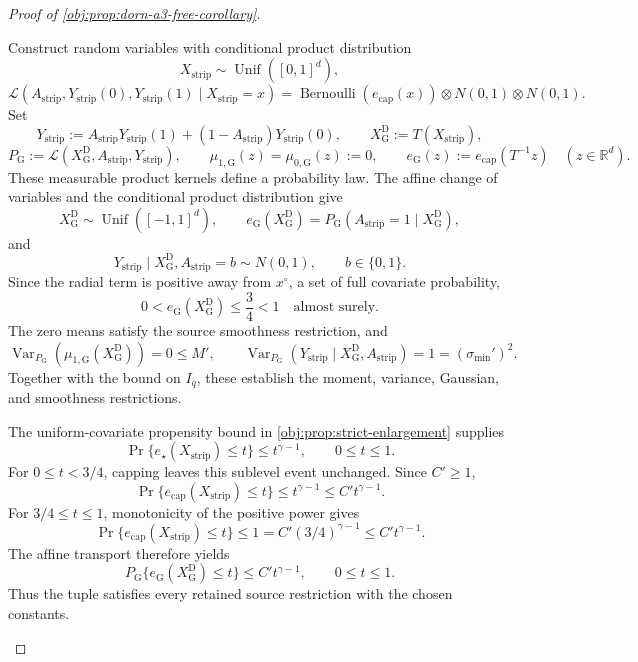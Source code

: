 \begin{proof}[Proof of \cref{obj:prop:dorn-a3-free-corollary}]
\begin{enumerate}
Construct random variables with conditional product distribution
\[
X_{\mathrm{strip}}\sim\operatorname{Unif}([0,1]^d),
\]
\[
\mathcal L\!\left(
A_{\mathrm{strip}},Y_{\mathrm{strip}}(0),Y_{\mathrm{strip}}(1)
\mid X_{\mathrm{strip}}=x
\right)
=
\operatorname{Bernoulli}(e_{\mathrm{cap}}(x))
\otimes N(0,1)\otimes N(0,1).
\]
Set
\[
Y_{\mathrm{strip}}
:=
A_{\mathrm{strip}}Y_{\mathrm{strip}}(1)
+(1-A_{\mathrm{strip}})Y_{\mathrm{strip}}(0),
\qquad
X_{\mathrm G}^{\mathrm D}:=T(X_{\mathrm{strip}}),
\]
\[
P_{\mathrm G}:=
\mathcal L(X_{\mathrm G}^{\mathrm D},A_{\mathrm{strip}},Y_{\mathrm{strip}}),
\qquad
\mu_{1,\mathrm G}(z)=\mu_{0,\mathrm G}(z):=0,
\qquad
e_{\mathrm G}(z):=e_{\mathrm{cap}}(T^{-1}z)
\quad(z\in\mathbb R^d).
\]
These measurable product kernels define a probability law. The affine change of variables and the conditional product distribution give
\[
X_{\mathrm G}^{\mathrm D}\sim\operatorname{Unif}([-1,1]^d),
\qquad
e_{\mathrm G}(X_{\mathrm G}^{\mathrm D})
=
P_{\mathrm G}(A_{\mathrm{strip}}=1\mid X_{\mathrm G}^{\mathrm D}),
\]
and
\[
Y_{\mathrm{strip}}
\mid X_{\mathrm G}^{\mathrm D},A_{\mathrm{strip}}=b
\sim N(0,1),
\qquad b\in\{0,1\}.
\]
Since the radial term is positive away from \(x^\circ\), a set of full covariate probability,
\[
0<e_{\mathrm G}(X_{\mathrm G}^{\mathrm D})\le\frac34<1
\quad\text{almost surely}.
\]
The zero means satisfy the source smoothness restriction, and
\[
\operatorname{Var}_{P_{\mathrm G}}(\mu_{1,\mathrm G}(X_{\mathrm G}^{\mathrm D}))=0\le M',
\qquad
\operatorname{Var}_{P_{\mathrm G}}(Y_{\mathrm{strip}}\mid
X_{\mathrm G}^{\mathrm D},A_{\mathrm{strip}})=1=(\sigma_{\min}')^2.
\]
Together with the bound on \(I_q\), these establish the moment, variance, Gaussian, and smoothness restrictions.

The uniform-covariate propensity bound in
\cref{obj:prop:strict-enlargement} supplies
\[
\Pr\{e_\star(X_{\mathrm{strip}})\le t\}\le t^{\gamma-1},
\qquad 0\le t\le1.
\]
For \(0\le t<3/4\), capping leaves this sublevel event unchanged. Since \(C'\ge1\),
\[
\Pr\{e_{\mathrm{cap}}(X_{\mathrm{strip}})\le t\}
\le t^{\gamma-1}\le C't^{\gamma-1}.
\]
For \(3/4\le t\le1\), monotonicity of the positive power gives
\[
\Pr\{e_{\mathrm{cap}}(X_{\mathrm{strip}})\le t\}
\le1
=
C'(3/4)^{\gamma-1}
\le C't^{\gamma-1}.
\]
The affine transport therefore yields
\[
P_{\mathrm G}\{e_{\mathrm G}(X_{\mathrm G}^{\mathrm D})\le t\}
\le C't^{\gamma-1},
\qquad 0\le t\le1.
\]
Thus the tuple satisfies every retained source restriction with the chosen constants.


\end{enumerate}
\end{proof}
